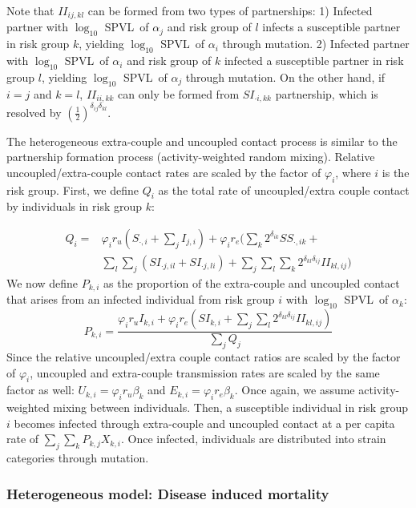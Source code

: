 \documentclass[10pt,letterpaper]{article}
\newcommand{\kkhalf}{\left(\frac{1}{2}\right)^{\delta_{ij} \delta_{kl}}}  %
\newcommand{\Lspvl}{$\log_{10}$ SPVL}
\begin{document}
Note that $II_{ij,kl}$ can be formed from two types of partnerships: 1) Infected partner with \Lspvl\ of $\alpha_j$ and risk group of $l$ infects a susceptible partner in risk group $k$, yielding \Lspvl\ of $\alpha_i$ through mutation. 2) Infected partner with \Lspvl\ of $\alpha_i$ and risk group of $k$ infected a susceptible partner in risk group $l$, yielding \Lspvl\ of $\alpha_j$ through mutation. On the other hand, if $i = j$ and $k = l$, $II_{ii,kk}$ can only be formed from $SI_{\cdot i, kk}$ partnership, which is resolved by $\kkhalf$.

The heterogeneous extra-couple and uncoupled contact process is similar to the partnership formation process (activity-weighted random mixing). Relative uncoupled/extra-couple contact rates are scaled by the factor of $\varphi_i$, where $i$ is the risk group. First, we define $Q_{i}$ as the total rate of uncoupled/extra couple contact by individuals in risk group $k$:

\begin{equation}
\begin{aligned}
Q_i = &\varphi_i r_u (S_{\cdot,i} +  \sum_j I_{j,i}) + \varphi_i r_e \bigg( \sum_k 2^{\delta_{ik}} SS_{\cdot, ik} +\\
&\sum_l \sum_j (SI_{\cdot j,il} + SI_{\cdot j, li}) + \sum_j \sum_l \sum_k 2^{\delta_{kl} \delta_{ij}} II_{kl,ij} \bigg)
\end{aligned}
\end{equation}
We now define $P_{k,i}$ as the proportion of the extra-couple and uncoupled contact that arises from an infected individual from risk group $i$ with \Lspvl\ of $\alpha_k$:
\begin{equation}
P_{k,i} = \frac{\varphi_i r_u I_{k,i} + \varphi_i r_e (SI_{k,i} + \sum_j \sum_l 2^{\delta_{kl} \delta_{ij} } II_{kl,ij} )}{\sum_j Q_j}
\end{equation}
Since the relative uncoupled/extra couple contact ratios are scaled by the factor of $\varphi_i$, uncoupled and extra-couple transmission rates are scaled by the same factor as well: $U_{k,i} = \varphi_i r_u \beta_k$ and $E_{k,i} = \varphi_i r_e \beta_k$. Once again, we assume activity-weighted mixing between individuals. Then, a susceptible individual in risk group $i$ becomes infected through extra-couple and uncoupled contact at a per capita rate of $\sum_j \sum_k P_{k,j} X_{k,i}$. Once infected, individuals are distributed into strain categories through mutation.

\subsubsection*{Heterogeneous model: Disease induced mortality}
\end{document}
